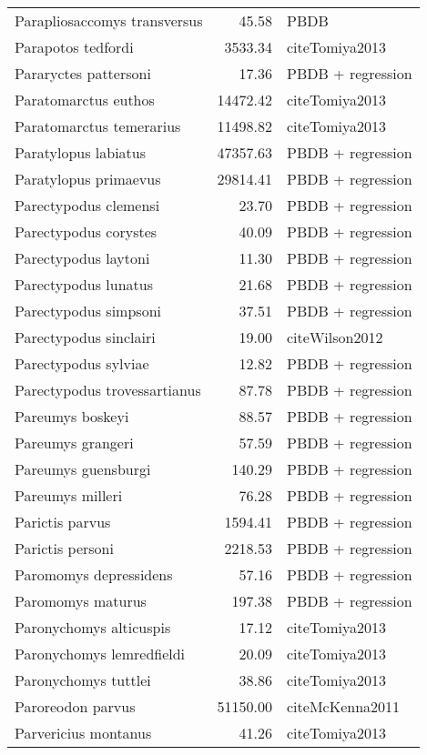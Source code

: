 \begin{table}[ht]
\begin{tabular}{lrl}
  Parapliosaccomys transversus & 45.58 & PBDB \\ 
  Parapotos tedfordi & 3533.34 & cite{Tomiya2013} \\ 
  Pararyctes pattersoni & 17.36 & PBDB + regression \\ 
  Paratomarctus euthos & 14472.42 & cite{Tomiya2013} \\ 
  Paratomarctus temerarius & 11498.82 & cite{Tomiya2013} \\ 
  Paratylopus labiatus & 47357.63 & PBDB + regression \\ 
  Paratylopus primaevus & 29814.41 & PBDB + regression \\ 
  Parectypodus clemensi & 23.70 & PBDB + regression \\ 
  Parectypodus corystes & 40.09 & PBDB + regression \\ 
  Parectypodus laytoni & 11.30 & PBDB + regression \\ 
  Parectypodus lunatus & 21.68 & PBDB + regression \\ 
  Parectypodus simpsoni & 37.51 & PBDB + regression \\ 
  Parectypodus sinclairi & 19.00 & cite{Wilson2012} \\ 
  Parectypodus sylviae & 12.82 & PBDB + regression \\ 
  Parectypodus trovessartianus & 87.78 & PBDB + regression \\ 
  Pareumys boskeyi & 88.57 & PBDB + regression \\ 
  Pareumys grangeri & 57.59 & PBDB + regression \\ 
  Pareumys guensburgi & 140.29 & PBDB + regression \\ 
  Pareumys milleri & 76.28 & PBDB + regression \\ 
  Parictis parvus & 1594.41 & PBDB + regression \\ 
  Parictis personi & 2218.53 & PBDB + regression \\ 
  Paromomys depressidens & 57.16 & PBDB + regression \\ 
  Paromomys maturus & 197.38 & PBDB + regression \\ 
  Paronychomys alticuspis & 17.12 & cite{Tomiya2013} \\ 
  Paronychomys lemredfieldi & 20.09 & cite{Tomiya2013} \\ 
  Paronychomys tuttlei & 38.86 & cite{Tomiya2013} \\ 
  Paroreodon parvus & 51150.00 & cite{McKenna2011} \\ 
  Parvericius montanus & 41.26 & cite{Tomiya2013} \\ 

\end{tabular}
\end{table}
